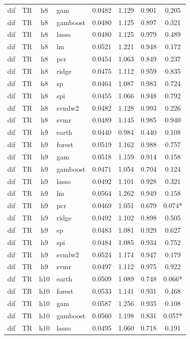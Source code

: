 \begin{ThreePartTable}
\begin{longtable}[t]{llclcccc}
dif & TR & h8 & gam & 0.0482 & 1.129 & 0.901 & 0.205\\
dif & TR & h8 & gamboost & 0.0480 & 1.125 & 0.897 & 0.321\\
dif & TR & h8 & lasso & 0.0480 & 1.125 & 0.979 & 0.489\\
dif & TR & h8 & lm & 0.0521 & 1.221 & 0.948 & 0.172\\
dif & TR & h8 & pcr & 0.0454 & 1.063 & 0.849 & 0.237\\
dif & TR & h8 & ridge & 0.0475 & 1.112 & 0.959 & 0.835\\
dif & TR & h8 & sp & 0.0464 & 1.087 & 0.983 & 0.724\\
dif & TR & h8 & spi & 0.0455 & 1.066 & 0.948 & 0.792\\
dif & TR & h8 & svmlw2 & 0.0482 & 1.128 & 0.993 & 0.226\\
dif & TR & h8 & svmr & 0.0489 & 1.145 & 0.985 & 0.940\\
\addlinespace
dif & TR & h9 & earth & 0.0440 & 0.984 & 0.440 & 0.108\\
dif & TR & h9 & forest & 0.0519 & 1.162 & 0.988 & 0.757\\
dif & TR & h9 & gam & 0.0518 & 1.159 & 0.914 & 0.158\\
dif & TR & h9 & gamboost & 0.0471 & 1.054 & 0.704 & 0.124\\
dif & TR & h9 & lasso & 0.0492 & 1.101 & 0.928 & 0.321\\
dif & TR & h9 & lm & 0.0564 & 1.262 & 0.949 & 0.158\\
dif & TR & h9 & pcr & 0.0469 & 1.051 & 0.679 & 0.074*\\
dif & TR & h9 & ridge & 0.0492 & 1.102 & 0.898 & 0.505\\
dif & TR & h9 & sp & 0.0483 & 1.081 & 0.929 & 0.627\\
dif & TR & h9 & spi & 0.0484 & 1.085 & 0.934 & 0.752\\
dif & TR & h9 & svmlw2 & 0.0524 & 1.174 & 0.947 & 0.179\\
dif & TR & h9 & svmr & 0.0497 & 1.112 & 0.975 & 0.922\\
\addlinespace
dif & TR & h10 & earth & 0.0509 & 1.089 & 0.748 & 0.066*\\
dif & TR & h10 & forest & 0.0533 & 1.141 & 0.931 & 0.468\\
dif & TR & h10 & gam & 0.0587 & 1.256 & 0.935 & 0.108\\
dif & TR & h10 & gamboost & 0.0560 & 1.198 & 0.831 & 0.057*\\
dif & TR & h10 & lasso & 0.0495 & 1.060 & 0.718 & 0.191\\

\end{longtable}
\end{ThreePartTable}
